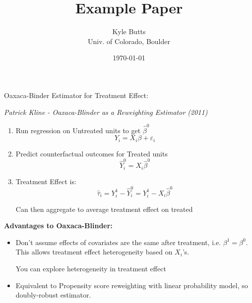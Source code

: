 \documentclass[11pt]{article}
\title{\color{navyblue} Example Paper}
\author{\normalsize Kyle Butts\\{\footnotesize Univ. of Colorado, Boulder}}
\date{\footnotesize\today}
\begin{document}
Oaxaca-Binder Estimator for Treatment Effect: 

\textit{Patrick Kline - Oaxaca-Blinder as a Reweighting Estimator (2011)}

\begin{enumerate}
   \item Run regression on Untreated units to get $\hat{\beta}^0$
   \[ 
        Y_i = X_i \beta + \varepsilon_i    
   \]

   \item Predict counterfactual outcomes for Treated units
   \[ 
        \hat{Y}_i^0 = X_i \hat{\beta}^0
   \]
   
   \item Treatment Effect is:
    \[ 
        \hat{\tau}_i = Y_i^1 - \hat{Y}_i^0 = Y_i^1 - X_i \hat{\beta}^0
    \]

    Can then aggregate to average treatment effect on treated
\end{enumerate}


\textbf{Advantages to Oaxaca-Blinder:}

\begin{itemize}
    \item Don't assume effects of covariates are the same after treatment, i.e. $\beta^1 = \beta^0$. This allows treatment effect heterogeneity based on $X_i$'s.
    
    You can explore heterogeneity in treatment effect
    
    \item Equivalent to Propensity score reweighting with linear probability model, so doubly-robust estimator.
\end{itemize}
\end{document}

